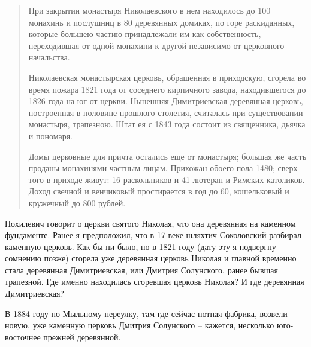 \begin{quotation}
При закрытии монастыря Николаевского в нем находилось до 100 монахинь и послушниц в 80 деревянных домиках, по горе раскиданных, которые большею частию принадлежали им как собственность, переходившая от одной монахини к другой независимо от церковного начальства.

Николаевская монастырская церковь, обращенная в приходскую, сгорела во время пожара 1821 года от соседнего кирпичного завода, находившегося до 1826 года на юг от церкви. Нынешняя Димитриевская деревянная церковь, построенная в половине прошлого столетия, считалась при существовании монастыря, трапезною. Штат ея с 1843 года состоит из священника, дьячка и пономаря. 

Домы церковные для причта остались еще от монастыря; большая же часть проданы монахинями частным лицам. Прихожан обоего пола 1480; сверх того в приходе живут: 16 раскольников и 41 лютеран и Римских католиков. Доход свечной и венчиковый простирается в год до 60, кошельковый и кружечный до 800 рублей.
\end{quotation}

Похилевич говорит о церкви святого Николая, что она деревянная на каменном фундаменте. Ранее я предположил, что в 17 веке шляхтич Соколовский разбирал каменную церковь. Как бы ни было, но в 1821 году (дату эту я подвергну сомнению позже) сгорела уже деревянная церковь Николая и главной временно стала деревянная Димитриевская, или Дмитрия Солунского, ранее бывшая трапезной. Где именно находилась сгоревшая церковь Николая? И где деревянная Димитриевская?

В 1884 году по Мыльному переулку, там где сейчас нотная фабрика, возвели новую, уже каменную церковь Дмитрия Солунского – кажется, несколько юго-восточнее прежней деревянной.

